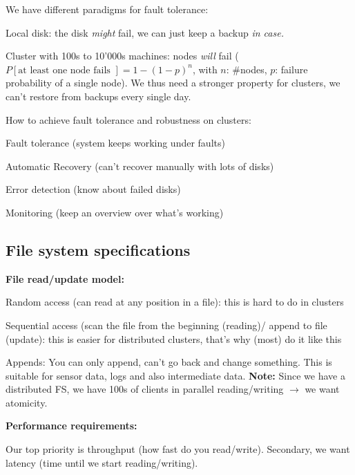\documentclass[11pt,oneside,a4paper]{article}
\begin{document}
We have different paradigms for fault tolerance:

\begin{compactitem}
	\item Local disk: the disk \textit{might} fail, we can just keep a backup \textit{in case.}
	\item Cluster with 100s to 10'000s machines: nodes \textit{will} fail ($P[\text{at least one node fails
	}] = 1-(1-p)^n$, with $n$: \#nodes, $p$: failure probability of a single node). We thus need a stronger property for clusters, we can't restore from backups every single day.
\end{compactitem}

How to achieve fault tolerance and robustness on clusters:

\begin{compactitem}
	\item Fault tolerance (system keeps working under faults)
	\item Automatic Recovery (can't recover manually with lots of disks)
	\item Error detection (know about failed disks)
	\item Monitoring (keep an overview over what's working)
\end{compactitem}

\subsection{File system specifications}

\textbf{File read/update model:}

\begin{compactitem}
	\item Random access (can read at any position in a file): this is hard to do in clusters
	\item Sequential access (scan the file from the beginning (reading)/ append to file (update): this is easier for distributed clusters, that's why (most) do it like this
\end{compactitem}

Appends: You can only append, can't go back and change something. This is suitable for sensor data, logs and also intermediate data. \textbf{Note:} Since we have a distributed FS, we have 100s of clients in parallel reading/writing $\rightarrow$ we want atomicity.

\textbf{Performance requirements:}

Our top priority is throughput (how fast do you read/write). Secondary, we want latency (time until we start reading/writing).
\end{document}
